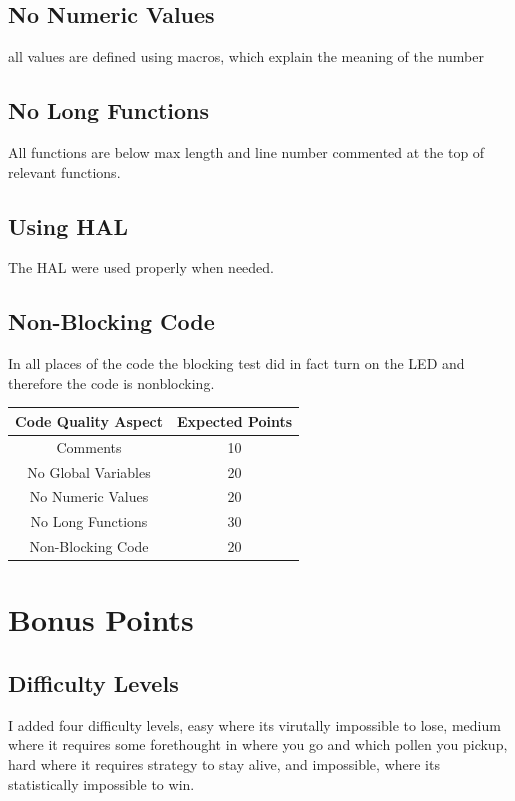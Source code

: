 \documentclass{article}
\begin{document}
\subsection{No Numeric Values}
\begin{center}
    all values are defined using macros, which explain the meaning of the number
\end{center}
\subsection{No Long Functions}
\begin{center}
    All functions are below max length and line number commented at the top of relevant functions.
\end{center}
\subsection{Using HAL} 
\begin{center}
    The HAL were used properly when needed.
\end{center}
\subsection{Non-Blocking Code}
\begin{center}
    In all places of the code the blocking test did in fact turn on the LED and therefore the code is nonblocking.
\end{center}
\begin{center}
    \begin{tabular}{c|c}
         Code Quality Aspect &  Expected Points\\
         \hline
         Comments & 10\\
         No Global Variables & 20\\
         No Numeric Values & 20\\
         No Long Functions & 30\\
         Non-Blocking Code & 20\\
    \end{tabular}
\end{center}
\newpage
\section{Bonus Points}
\subsection{Difficulty Levels}
\begin{center}
    I added four difficulty levels, easy where its virutally impossible to lose, medium where it requires some forethought in where you go and which pollen you pickup, hard where it requires strategy to stay alive, and impossible, where its statistically impossible to win.
\end{center}
\end{document}

